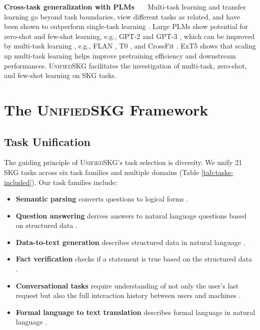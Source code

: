 \textbf{Cross-task generalization with PLMs \ \ } Multi-task learning and transfer learning go beyond task boundaries, view different tasks as related, and have been shown to outperform single-task learning \cite{muppet,vu2021spot}. Large PLMs show potential for zero-shot and few-shot learning, e.g., GPT-2 \cite{radford2019language} and GPT-3 \cite{brown2020language}, which can be improved by multi-task learning \cite{Zhong2021AdaptingLM}, e.g., FLAN \cite{Jason2021}, T0 \cite{sanh2021multitask}, and CrossFit \cite{Ye2021CrossFitAF}. ExT5 \cite{aribandi2021ext5} shows that scaling up multi-task learning helps improve pretraining efficiency and downstream performances.
\textsc{Unified}SKG facilitates the investigation of multi-task, zero-shot, and few-shot learning on SKG tasks. 

\section{The \textsc{Unified}SKG Framework}
\label{sec:method}

\subsection{Task Unification}
\label{subsec:task_unification}
The guiding principle of \textsc{Unified}SKG's task selection is diversity. We unify 21 SKG tasks across six task families and multiple domains (Table \ref{tab:tasks-included}). Our task families include:

\begin{itemize}[leftmargin=*]
    \item \textbf{Semantic parsing} converts questions to logical forms \cite{ZelleM96,Zettlemoyer05}.
    \item \textbf{Question answering} derives answers to natural language questions based on structured data \cite{BerantCFL13}.
    \item \textbf{Data-to-text generation} describes structured data in natural language \cite{NovikovaDR17}.
    \item \textbf{Fact verification} checks if a statement is true based on the structured data \cite{2019TabFactA}.
    \item \textbf{Conversational tasks} require understanding of not only the user's last request but also the full interaction history between users and machines \cite{budzianowski2018large, eric2019multiwoz, yu-etal-2019-cosql}.
    \item \textbf{Formal language to text translation} describes formal language in natural language \cite{chen-etal-2020-logic2text}. 
\end{itemize}

